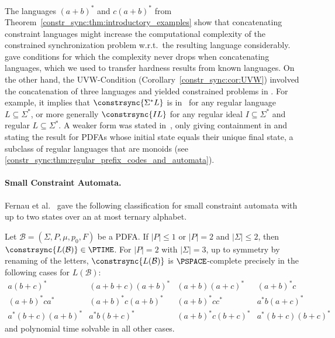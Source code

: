 The languages $(a+b)^*$ and $c(a+b)^*$ from Theorem~\ref{constr_sync:thm:introductory_examples} 
show that concatenating constraint languages might 
increase the computational complexity of the constrained synchronization problem 
w.r.t.~the resulting language
considerably. 
 gave conditions for which the complexity never drops when concatenating languages,
which we used to transfer hardness results from known languages. 
On the other hand, the UVW-Condition (Corollary~\ref{constr_sync:cor:UVW}) 
involved the concatenation of three languages 
and yielded constrained problems in \NL.
For example, it implies that $\constrsync{\Sigma^*L}$ 
is in \NL\ for any regular language $L \subseteq \Sigma^*$,
or more generally $\constrsync{IL}$ for any regular ideal $I \subseteq \Sigma^*$ and regular $L \subseteq \Sigma^*$.
A weaker form was stated in~\cite[Thm.~4.1]{DBLP:conf/cocoon/Hoffmann21}, only giving
containment in \PTIME and stating the result for 
PDFAs whose initial state equals their unique final state, a subclass of regular languages that are monoids (see \cref{constr_sync:thm:regular_prefix_codes_and_automata}).


\paragraph{Small Constraint Automata.} Fernau et al.~\cite{FernauGHHVW19}
gave the following classification for small constraint automata with up 
to two states over an at most ternary alphabet.

\begin{theorem}
	\label{thm:classification_MFCS_paper}
	Let $\mathcal B = (\Sigma, P, \mu, p_0, F)$
	be a PDFA.
	If $|P|\le 1$ or $|P| = 2$ and $|\Sigma|\le 2$, then $\constrsync{L(\mathcal B)} \in \PTIME$.
	For $|P| = 2$ with $|\Sigma| = 3$, up to symmetry by renaming of the letters,
	$\constrsync{L(\mathcal B)}$ %
	is $\PSPACE$-complete precisely in the following cases for $L(\mathcal B)$:
	\[ 
	\begin{array}{llll}
		a(b+c)^*        & (a+b+c)(a+b)^*  & (a+b)(a+c)^* & (a+b)^*c \\
		(a+b)^*ca^*     & (a+b)^*c(a+b)^* & (a+b)^*cc^*  & a^*b(a+c)^* \\
		a^*(b+c)(a+b)^* & a^*b(b+c)^*     & (a+b)^*c(b+c)^* & a^*(b+c)(b+c)^*
	\end{array}
	\]
	and polynomial time solvable in all other cases.
\end{theorem}

